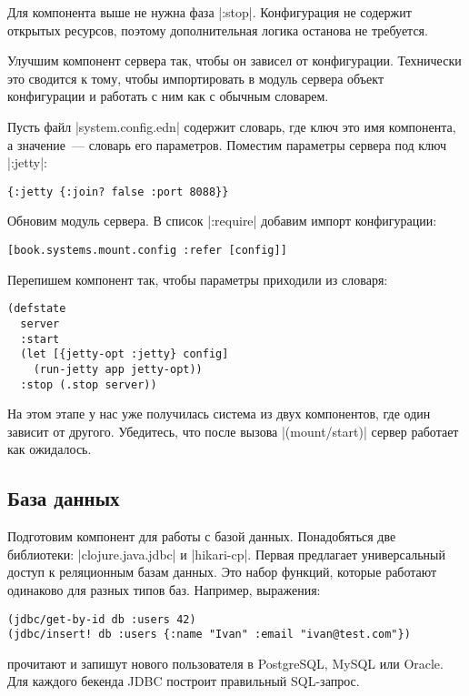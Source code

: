 Для компонента выше не нужна фаза \spverb|:stop|. Конфигурация не содержит открытых
ресурсов, поэтому дополнительная логика останова не требуется.

Улучшим компонент сервера так, чтобы он зависел от конфигурации. Технически это
сводится к тому, чтобы импортировать в модуль сервера объект конфигурации и
работать с ним как с обычным словарем.

Пусть файл \spverb|system.config.edn| содержит словарь, где ключ это имя компонента, а
значение~--- словарь его параметров. Поместим параметры сервера под ключ \spverb|:jetty|:

\begin{verbatim}
{:jetty {:join? false :port 8088}}
\end{verbatim}

Обновим модуль сервера. В список \spverb|:require| добавим импорт конфигурации:

\begin{verbatim}
[book.systems.mount.config :refer [config]]
\end{verbatim}

Перепишем компонент так, чтобы параметры приходили из словаря:

\begin{verbatim}
(defstate
  server
  :start
  (let [{jetty-opt :jetty} config]
    (run-jetty app jetty-opt))
  :stop (.stop server))
\end{verbatim}

На этом этапе у нас уже получилась система из двух компонентов, где один зависит
от другого. Убедитесь, что после вызова \spverb|(mount/start)| сервер работает как
ожидалось.

\subsection{База данных}

Подготовим компонент для работы с базой данных. Понадобяться две библиотеки:
\spverb|clojure.java.jdbc| и \spverb|hikari-cp|. Первая предлагает универсальный доступ к
реляционным базам данных. Это набор функций, которые работают одинаково для
разных типов баз. Например, выражения:

\begin{verbatim}
(jdbc/get-by-id db :users 42)
(jdbc/insert! db :users {:name "Ivan" :email "ivan@test.com"})
\end{verbatim}

прочитают и запишут нового пользователя в PostgreSQL, MySQL или Oracle. Для
каждого бекенда JDBC построит правильный SQL-запрос.


